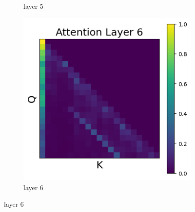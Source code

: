 \documentclass[11pt]{article}
\begin{document}
\begin{figure}[t]
\begin{subfigure}[t]{0.24\textwidth}
    \caption{layer 5}
  \end{subfigure}\hfill
  \begin{subfigure}[t]{0.24\textwidth}
    \centering
    \includegraphics[width=1.4\columnwidth]{figures/intervention5/layer_6.png}
    \caption{layer 6}
  \end{subfigure}\hfill


\end{figure}
\end{document}
